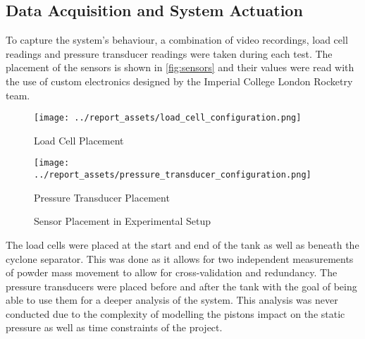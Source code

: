 \subsection{Data Acquisition and System Actuation}
To capture the system's behaviour, a combination of video recordings, load cell readings and pressure transducer readings were taken during each test. The placement of the sensors is shown in \autoref{fig:sensors} and their values were read with the use of custom electronics designed by the Imperial College London Rocketry team.
\begin{figure}[htbp]
    \centering

    \begin{minipage}{0.45\textwidth}
        \centering
        \texttt{[image: ../report\_assets/load\_cell\_configuration.png]}
        \caption*{Load Cell Placement}
    \end{minipage}
    \hfill
    \begin{minipage}{0.45\textwidth}
        \centering
        \texttt{[image: ../report\_assets/pressure\_transducer\_configuration.png]}
        \caption*{Pressure Transducer Placement}
    \end{minipage}
    \caption{Sensor Placement in Experimental Setup}\label{fig:sensors}
\end{figure}
The load cells were placed at the start and end of the tank as well as beneath the cyclone separator. This was done as it allows for two independent measurements of powder mass movement to allow for cross-validation and redundancy. The pressure transducers were placed before and after the tank with the goal of being able to use them for a deeper analysis of the system. This analysis was never conducted due to the complexity of modelling the pistons impact on the static pressure as well as time constraints of the project.

